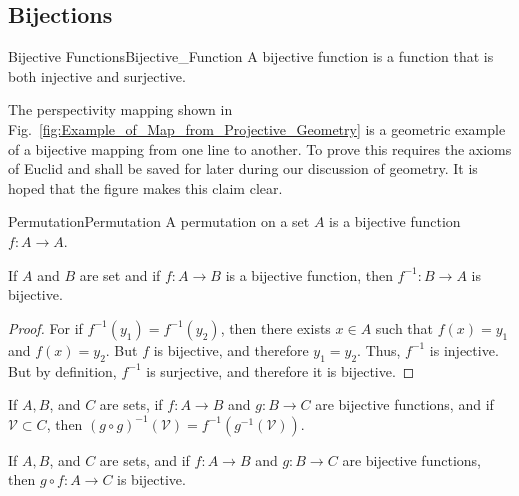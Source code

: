     \subsection{Bijections}
        \begin{fdefinition}{Bijective Functions}{Bijective_Function}
            A \gls{bijective function} is a function that is both injective and
            surjective.
        \end{fdefinition}
        \begin{example}
            The perspectivity mapping shown in
            Fig.~\ref{fig:Example_of_Map_from_Projective_Geometry} is a
            geometric example of a bijective mapping from one line to another.
            To prove this requires the axioms of Euclid and shall be saved for
            later during our discussion of geometry. It is hoped that the figure
            makes this claim clear.
        \end{example}
        \begin{fdefinition}{Permutation}{Permutation}
            A \gls{permutation} on a \gls{set} $A$ is a \gls{bijective function}
            $f:A\rightarrow{A}$.
        \end{fdefinition}
        \begin{theorem}
            If $A$ and $B$ are set and if $f:A\rightarrow{B}$ is a bijective
            function, then $f^{\minus{1}}:B\rightarrow{A}$ is bijective.
        \end{theorem}
        \begin{proof}
            For if $f^{\minus{1}}(y_{1})=f^{\minus{1}}(y_{2})$, then there
            exists $x\in{A}$ such that $f(x)=y_{1}$ and $f(x)=y_{2}$. But
            $f$ is bijective, and therefore $y_{1}=y_{2}$. Thus, $f^{\minus{1}}$
            is injective. But by definition, $f^{\minus{1}}$ is surjective, and
            therefore it is bijective.
        \end{proof}
        \begin{theorem}
            If $A,B$, and $C$ are sets, if $f:A\rightarrow{B}$ and
            $g:B\rightarrow{C}$ are bijective functions, and if
            $\mathcal{V}\subset{C}$, then
            $(g\circ g)^{-1}(\mathcal{V})=f^{-1}(g^{-1}(\mathcal{V}))$.
        \end{theorem}
        \begin{theorem}
            If $A,B$, and $C$ are sets, and if $f:A\rightarrow{B}$ and
            $g:B\rightarrow{C}$ are bijective functions, then
            $g\circ{f}:A\rightarrow{C}$ is bijective.
        \end{theorem}
